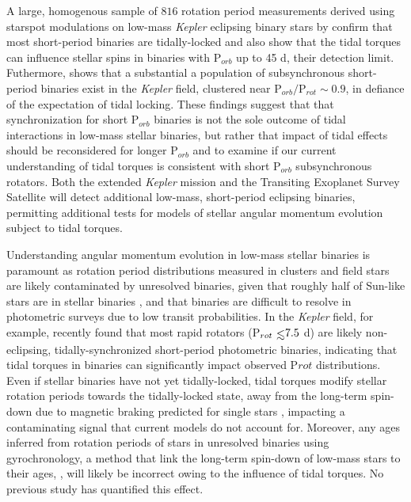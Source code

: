 \documentclass[twocolumn]{aastex61}
\def\lsim{~\rlap{$<$}{\lower 1.0ex\hbox{$\sim$}}}
\newcommand{\kepler}[0]{\textit{Kepler}\xspace}
\begin{document}
A large, homogenous sample of $816$ rotation period measurements derived using starspot modulations on low-mass \kepler eclipsing binary stars by \citet{Lurie2017} confirm that most short-period binaries are tidally-locked and also show that the tidal torques can influence stellar spins in binaries with P$_{orb}$ up to 45 d, their detection limit. Futhermore, \citet{Lurie2017} shows that a substantial a population of subsynchronous short-period binaries exist in the \kepler field, clustered near P$_{orb}/$P$_{rot}{\sim} 0.9$, in defiance of the expectation of tidal locking.  These findings suggest that that synchronization for short P$_{orb}$ binaries is not the sole outcome of tidal interactions in low-mass stellar binaries, but rather that impact of tidal effects should be reconsidered for longer P$_{orb}$ and to examine if our current understanding of tidal torques is consistent with short P$_{orb}$ subsynchronous rotators.  Both the extended \kepler mission \citep[K2,][]{Howell2014} and the Transiting Exoplanet Survey Satellite \citep[TESS, ][]{Ricker2014,Sullivan2015} will detect additional low-mass, short-period eclipsing binaries, permitting additional tests for models of stellar angular momentum evolution subject to tidal torques.
 
Understanding angular momentum evolution in low-mass stellar binaries is paramount as rotation period distributions measured in clusters and field stars are likely contaminated by unresolved binaries, given that roughly half of Sun-like stars are in stellar binaries \citep{Raghavan2010,Duchene2013}, and that binaries are difficult to resolve in photometric surveys due to low transit probabilities. In the \kepler field, for example, \citet{Simonian2018} recently found that most rapid rotators (P$_{rot} \lsim 7.5$ d) are likely non-eclipsing, tidally-synchronized short-period photometric binaries, indicating that tidal torques in binaries can significantly impact observed P${rot}$ distributions.  Even if stellar binaries have not yet tidally-locked, tidal torques modify stellar rotation periods towards the tidally-locked state, away from the long-term spin-down due to magnetic braking predicted for single stars \citep{Dunn1961,Skumanich1972,Barnes2003}, impacting a contaminating signal that current models do not account for. Moreover, any ages inferred from rotation periods of stars in unresolved binaries using gyrochronology, a method that link the long-term spin-down of low-mass stars to their ages, \citep{Skumanich1972,Barnes2003,Barnes2007,Mamajek2008,Barnes2010}, will likely be incorrect owing to the influence of tidal torques. No previous study has quantified this effect.  
\end{document}

